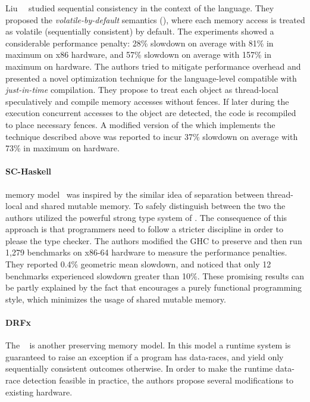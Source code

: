 Liu~\etal~\cite{Liu-al:OOPSLA17, Liu-al:PLDI19} studied 
sequential consistency in the context of the \Java language.  
They proposed the \emph{volatile-by-default} semantics (\VbD),
where each memory access is treated as volatile 
(\ie sequentially consistent) by default. 
The experiments showed a considerable performance penalty:
28\% slowdown on average with 81\% in maximum on x86 hardware,
and 57\% slowdown on average with 157\% in maximum on  hardware.
The authors tried to mitigate performance overhead and presented  
a novel optimization technique for the language-level \SC
compatible with \emph{just-in-time} compilation. 
They propose to treat each object as thread-local speculatively 
and compile memory accesses without fences. 
If later during the execution concurrent accesses to the object  
are detected, the code is recompiled to place necessary fences.
A modified version of the \JVM which implements the technique
described above was reported to incur 37\% slowdown on average 
with 73\% in maximum on  hardware.

\paragraph{SC-Haskell}

\SCHs memory model~\cite{Vollmer-al:PPoPP17}
was inspired by the similar idea of separation
between thread-local and shared mutable memory. 
To safely distinguish between the two 
the authors utilized the powerful strong type system of \Haskell. 
The consequence of this approach is that  
programmers need to follow a stricter discipline 
in order to please the type checker. 
The authors modified the GHC to preserve \SC 
and then run 1,279 benchmarks on x86-64 hardware
to measure the performance penalties.
They reported 0.4\% geometric mean slowdown,
and noticed that only 12 benchmarks experienced 
slowdown greater than 10\%.
These promising results can be partly explained 
by the fact that \Haskell encourages a 
purely functional programming style, 
which minimizes the usage of shared mutable memory.  

\paragraph{DRFx}

The \DRFx~\cite{Marino-al:PLDI10, Marino-al:TOPLAS2016} 
is another \SC preserving memory model. 
In this model a runtime system is guaranteed to raise 
an exception if a program has data-races, 
and yield only sequentially consistent outcomes otherwise.
In order to make the runtime data-race detection feasible 
in practice, the authors propose several modifications 
to existing hardware.

